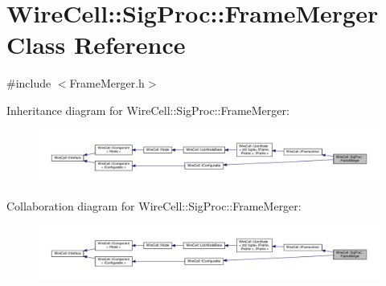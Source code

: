 \hypertarget{class_wire_cell_1_1_sig_proc_1_1_frame_merger}{}\section{Wire\+Cell\+:\+:Sig\+Proc\+:\+:Frame\+Merger Class Reference}
\label{class_wire_cell_1_1_sig_proc_1_1_frame_merger}


{\ttfamily \#include $<$Frame\+Merger.\+h$>$}



Inheritance diagram for Wire\+Cell\+:\+:Sig\+Proc\+:\+:Frame\+Merger\+:
\nopagebreak
\begin{figure}[H]
\begin{center}
\leavevmode
\includegraphics[width=350pt]{class_wire_cell_1_1_sig_proc_1_1_frame_merger__inherit__graph}
\end{center}
\end{figure}


Collaboration diagram for Wire\+Cell\+:\+:Sig\+Proc\+:\+:Frame\+Merger\+:
\nopagebreak
\begin{figure}[H]
\begin{center}
\leavevmode
\includegraphics[width=350pt]{class_wire_cell_1_1_sig_proc_1_1_frame_merger__coll__graph}
\end{center}
\end{figure}
